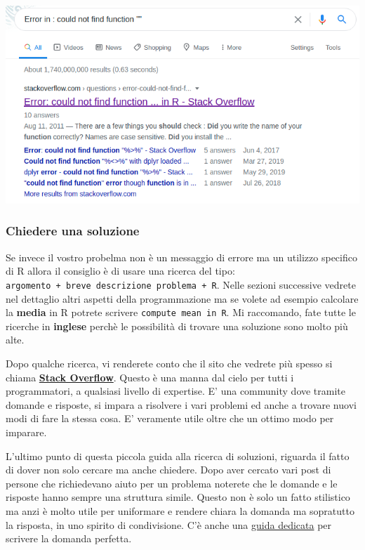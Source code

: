 \documentclass[
]{book}
\begin{document}
\includegraphics{images/stack_question.png}

\hypertarget{chiedere-una-soluzione}{%
\subsubsection{Chiedere una soluzione}\label{chiedere-una-soluzione}}

Se invece il vostro probelma non è un messaggio di errore ma un utilizzo specifico di R allora il consiglio è di usare una ricerca del tipo: \texttt{argomento\ +\ breve\ descrizione\ problema\ +\ R}. Nelle sezioni successive vedrete nel dettaglio altri aspetti della programmazione ma se volete ad esempio calcolare la \textbf{media} in R potrete scrivere \texttt{compute\ mean\ in\ R}.
Mi raccomando, fate tutte le ricerche in \textbf{inglese} perchè le possibilità di trovare una soluzione sono molto più alte.

Dopo qualche ricerca, vi renderete conto che il sito che vedrete più spesso si chiama \href{https://stackoverflow.com/}{\textbf{Stack Overflow}}. Questo è una manna dal cielo per tutti i programmatori, a qualsiasi livello di expertise. E' una community dove tramite domande e risposte, si impara a risolvere i vari problemi ed anche a trovare nuovi modi di fare la stessa cosa. E' veramente utile oltre che un ottimo modo per imparare.

L'ultimo punto di questa piccola guida alla ricerca di soluzioni, riguarda il fatto di dover non solo cercare ma anche chiedere. Dopo aver cercato vari post di persone che richiedevano aiuto per un problema noterete che le domande e le risposte hanno sempre una struttura simile. Questo non è solo un fatto stilistico ma anzi è molto utile per uniformare e rendere chiara la domanda ma sopratutto la risposta, in uno spirito di condivisione. C'è anche una \href{https://stackoverflow.com/help/how-to-ask}{guida dedicata} per scrivere la domanda perfetta.
\end{document}
